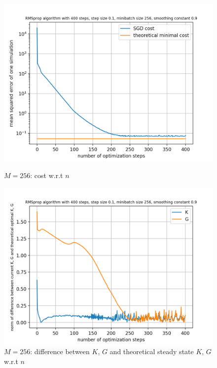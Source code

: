 \documentclass{article}
\begin{document}
\begin{figure}[h!]
	\centering
	\begin{minipage}[t]{.28\paperwidth}
		\centering
		\includegraphics[width=1.0\textwidth]{Figures/M256.png}
		\caption{$M=256$: cost w.r.t $n$}
	\end{minipage}%
	\begin{minipage}[t]{.28\paperwidth}
		\centering
		\includegraphics[width=1.0\textwidth]{Figures/d_M256.png}
		\caption{$M=256$: difference between $K$, $G$ and theoretical steady state $K$, $G$ w.r.t $n$}
	\end{minipage}%
	\begin{minipage}[t]{.28\paperwidth}
		\centering

\end{minipage}
\end{figure}
\end{document}
